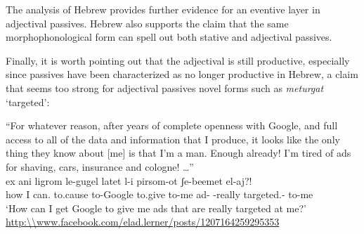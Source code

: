 \begin{exe}
\begin{xlist}
\begin{exe}
\begin{xlist}
\begin{exe}
\begin{exe}
\begin{xlist}
\begin{exe}
\begin{exe}
\begin{xlist}
\begin{exe}
\begin{xlist}
\begin{exe}
\begin{xlist}
\begin{exe}
\begin{xlist}
\begin{xlist}
\begin{exe}
\begin{xlist}
\begin{exe}
\begin{xlist}
\begin{exe}
\begin{exe}
\begin{exe}
\begin{xlist}
\begin{exe}
\begin{exe}
\begin{xlist}
\begin{exe}
\begin{xlist}
\begin{exe}
\begin{xlist}
\begin{exe}
\begin{xlist}
\begin{xlist}
\begin{exe}
\begin{xlist}
\begin{exe}
\begin{xlist}
\begin{exe}
\begin{xlist}
\begin{exe}
\begin{xlist}
\begin{exe}
\begin{exe}
\begin{exe}
\begin{exe}
\begin{exe}
\begin{xlist}
\begin{xlist}
\begin{exe}
\begin{xlist}
\begin{exe}
\begin{xlist}
\begin{exe}
\begin{exe}
\begin{exe}
\begin{xlist}
\begin{exe}
\begin{xlist}
\begin{exe}
\begin{xlist}
The analysis of Hebrew provides further evidence for an eventive layer in adjectival passives. Hebrew also supports the claim that the same morphophonological form can spell out both stative and adjectival passives.

Finally, it is worth pointing out that the adjectival  is still productive, especially since passives have been characterized as no longer productive in Hebrew, a claim that seems too strong for adjectival passives novel forms such as \emph{meturgat} `targeted':
 \begin{exe}
\ex  ``For whatever reason, after years of complete openness with Google, and full access to all of the data and information that I produce, it looks like the only thing they know about [me] is that I'm a man. Enough already! I'm tired of ads for shaving, cars, insurance and cologne! \dots '' \\
	 \gll ex ani  ligrom le-gugel latet l-i pirsom-ot ʃe-beemet  el-aj?!\\
 		  how I can. to.cause to-Google to.give to-me ad- -really targeted.- to-me\\
 		\glt `How can I get Google to give me ads that are really targeted at me?' \hfill \url{http:\\www.facebook.com/elad.lerner/posts/1207164259295353} 
 \z 



\end{exe}
\end{xlist}
\end{exe}
\end{xlist}
\end{exe}
\end{xlist}
\end{exe}
\end{exe}
\end{exe}
\end{xlist}
\end{exe}
\end{xlist}
\end{exe}
\end{xlist}
\end{xlist}
\end{exe}
\end{exe}
\end{exe}
\end{exe}
\end{exe}
\end{xlist}
\end{exe}
\end{xlist}
\end{exe}
\end{xlist}
\end{exe}
\end{xlist}
\end{exe}
\end{xlist}
\end{xlist}
\end{exe}
\end{xlist}
\end{exe}
\end{xlist}
\end{exe}
\end{xlist}
\end{exe}
\end{exe}
\end{xlist}
\end{exe}
\end{exe}
\end{exe}
\end{xlist}
\end{exe}
\end{xlist}
\end{exe}
\end{xlist}
\end{xlist}
\end{exe}
\end{xlist}
\end{exe}
\end{xlist}
\end{exe}
\end{xlist}
\end{exe}
\end{exe}
\end{xlist}
\end{exe}
\end{exe}
\end{xlist}
\end{exe}
\end{xlist}
\end{exe}
